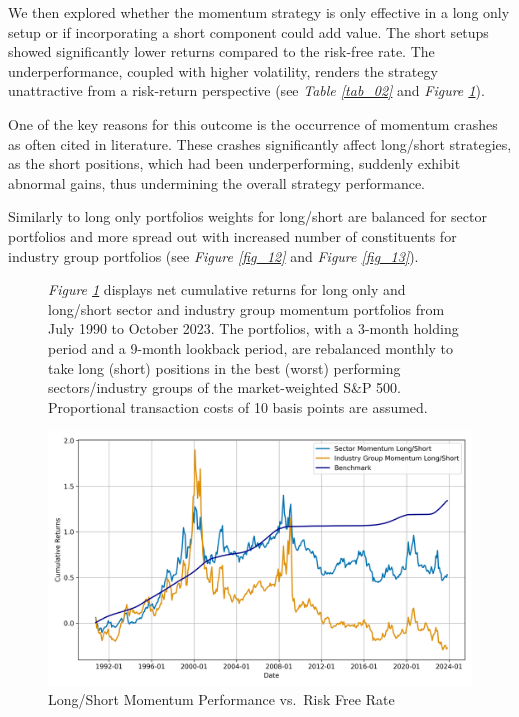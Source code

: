 \documentclass[a4paper,12pt,twoside]{article}
\begin{document}
\newpage
We then explored whether the momentum strategy is only effective in a long only setup or if incorporating a short component could add value. The short setups showed significantly lower returns compared to the risk-free rate. The underperformance, coupled with higher volatility, renders the strategy unattractive from a risk-return perspective (see \textit{Table \ref{tab_02}} and \textit{Figure \ref{fig_02}}).

One of the key reasons for this outcome is the occurrence of momentum crashes as often cited in literature. These crashes significantly affect long/short strategies, as the short positions, which had been underperforming, suddenly exhibit abnormal gains, thus undermining the overall strategy performance. 

Similarly to long only portfolios weights for long/short are balanced for sector portfolios and more spread out with increased number of constituents for industry group portfolios (see \textit{Figure \ref{fig_12}} and \textit{Figure \ref{fig_13}}). 

\begin{figure}[H] 
        \caption{Long/Short Momentum Performance vs.~Risk Free Rate} 
    \label{fig_02}
    \textit{Figure \ref{fig_02}} displays net cumulative returns for long only and long/short sector and industry group momentum portfolios from July 1990 to October 2023. The portfolios, with a 3-month holding period and a 9-month lookback period, are rebalanced monthly to take long (short) positions in the best (worst) performing sectors/industry groups of the market-weighted S\&P 500. Proportional transaction costs of 10 basis points are assumed.
    
\captionsetup{justification=centering}
\centerline{\includegraphics[width=1\textwidth]{Plots/strategy_plot_long_short.png}}
\end{figure}
\end{document}
